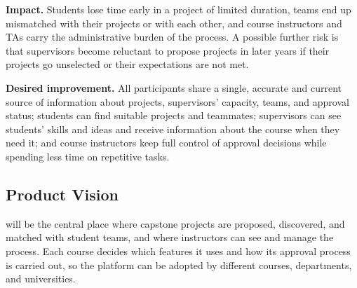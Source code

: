 \documentclass[12pt]{article}
\newcounter{tin}
\begin{document}
  \textbf{Impact.} Students lose time early in a project of limited duration, teams end up
  mismatched with their projects or with each other, and course instructors and TAs carry the administrative burden of the
  process. A possible further risk is that supervisors become reluctant to
  propose projects in later years if their projects go unselected or their expectations are not met.

  \textbf{Desired improvement.} All participants share a single, accurate and current source of
  information about projects, supervisors' capacity, teams, and approval status; students can find
  suitable projects and teammates; supervisors can see students’ skills and ideas and receive
  information about the course when they need it; and course instructors keep full control of
  approval decisions while spending less time on repetitive tasks.

  \subsection{Product Vision}





  \projname{} will be the central place where capstone projects are proposed, discovered, and
  matched with student teams, and where instructors can see and manage the process. Each course
  decides which features it uses and how its approval process is carried out, so the platform can
  be adopted by different courses, departments, and universities.
\end{document}
